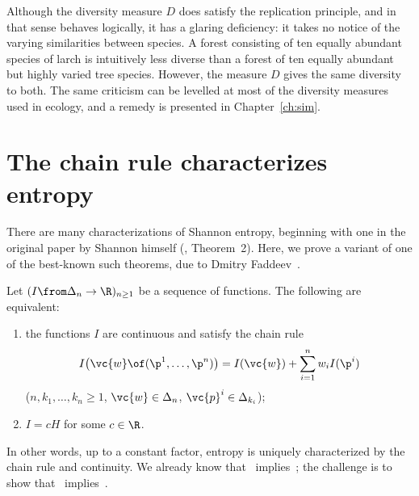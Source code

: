 Although the diversity measure $D$ does satisfy the replication principle,
and in that sense behaves logically, it has a glaring deficiency: it
takes no notice of the varying similarities%
%
% 
between species.  A forest consisting of ten equally abundant
species of larch is intuitively less diverse than a forest of ten equally
abundant but highly varied tree species.  However, the measure $D$ gives
the same diversity to both.  The same criticism can be levelled at most of
the diversity measures used in ecology, and a remedy is presented in
Chapter~\ref{ch:sim}.


\section{The chain rule characterizes entropy}


There are many characterizations of Shannon entropy, beginning with one in
the original paper by Shannon%
%
% 
himself (\cite{ShanMTC}, Theorem~2).  Here,
we prove a variant of one of the best-known such theorems, due
to Dmitry Faddeev~\cite{Fadd}.  

\begin{thm}[Faddeev]
%
% 
Let $( I \from \Delta_n \to \R )_{n \geq 1}$ be a sequence of
functions.  The following are equivalent:
% 
\begin{enumerate}
\item 
{}
the functions $I$ are continuous and satisfy the chain rule
\[
I\bigl(\vc{w} \of (\p^1, \ldots, \p^n)\bigr)
=
I(\vc{w}) + \sum_{i = 1}^n w_i I(\p^i)
\]
($n, k_1, \ldots, k_n \geq 1$, $\vc{w} \in \Delta_n$, $\vc{p}^i \in
\Delta_{k_i}$);

\item
{}
$I = cH$ for some $c \in \R$.
\end{enumerate}
\end{thm}

In other words, up to a constant factor, entropy is uniquely characterized
by the chain rule and continuity.  We already know
that~ implies~; the
challenge is to show that~
implies~. 

